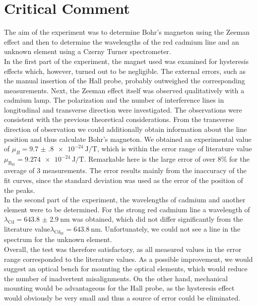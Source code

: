 \section{Critical Comment}
The aim of the experiment was to determine Bohr's magneton using the Zeeman effect and then to determine the wavelengths of the red cadmium line and an unknown element using a Czerny Turner spectrometer.\\
In the first part of the experiment, the magnet used was examined for hysteresis effects which, however, turned out to be negligible.
The external errors, such as the manual insertion of the Hall probe, probably outweighed the corresponding measurements.
Next, the Zeeman effect itself was observed qualitatively with a cadmium lamp.
The polarization and the number of interference lines in longitudinal and transverse direction were investigated.
The observations were consistent with the previous theoretical considerations.
From the transverse direction of observation we could additionally obtain information about the line position and thus calculate Bohr's magneton.
We obtained an experimental value of $\mu_{B} = \SI{9.7(8)e-24}{\joule\per\tesla}$, which is within the error range of literature value\\ $\mu_{\text{B}_\text{lit}} = \SI{9.274e-24}{\joule\per\tesla}$.
Remarkable here is the large error of over 8\% for the average of 3 measurements.
The error results mainly from the inaccuracy of the fit curves, since the standard deviation was used as the error of the position of the peaks.\\
In the second part of the experiment, the wavelengths of cadmium and another element were to be determined. For the strong red cadmium line a wavelength of $\lambda_\text{Cd}= \SI{643.8(29)}{\nano\meter}$ was obtained, which did not differ significantly from the literature value$\lambda_{\text{Cd}_\text{lit}} = \SI{643.8}{\nano\meter}$.
Unfortunately, we could not see a line in the spectrum for the unknown element.\\
Overall, the test was therefore satisfactory, as all measured values in the error range corresponded to the literature values.
As a possible improvement, we would suggest an optical bench for mounting the optical elements, which would reduce the number of inadvertent misalignments.
On the other hand, mechanical mounting would be advantageous for the Hall probe, as the hysteresis effect would obviously be very small and thus a source of error could be eliminated.